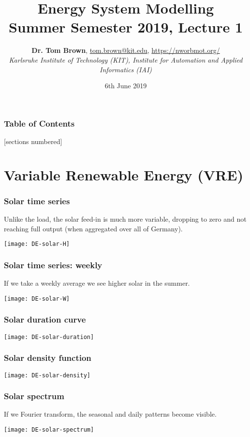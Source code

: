 \documentclass[10pt,aspectratio=169,dvipsnames]{beamer}
\title{Energy System Modelling\\ Summer Semester 2019, Lecture 1}
\author{
  {\bf Dr. Tom Brown}, \href{mailto:tom.brown@kit.edu}{tom.brown@kit.edu}, \url{https://nworbmot.org/}\\
  \emph{Karlsruhe Institute of Technology (KIT), Institute for Automation and Applied Informatics (IAI)}
}
\date{\vspace{.3cm}6th June 2019}
\begin{document}
\maketitle


\begin{frame}

  \frametitle{Table of Contents}
  [sections numbered]
  \tableofcontents[hideallsubsections]
\end{frame}


\section{Variable Renewable Energy (VRE)}



\begin{frame}
  \frametitle{Solar time series}

  Unlike the load, the solar feed-in is much more variable, dropping to zero and not reaching full output (when aggregated over all of Germany).


  \centering
  \texttt{[image: DE-solar-H]}

\end{frame}


\begin{frame}
  \frametitle{Solar time series: weekly}

  If we take a weekly average we see higher solar in the summer.

  \centering
  \texttt{[image: DE-solar-W]}

\end{frame}



\begin{frame}
  \frametitle{Solar duration curve}



  \centering
  \texttt{[image: DE-solar-duration]}

\end{frame}




\begin{frame}
  \frametitle{Solar density function}

  \centering
  \texttt{[image: DE-solar-density]}

\end{frame}




\begin{frame}
  \frametitle{Solar spectrum}

  If we Fourier transform, the \alert{seasonal} and \alert{daily} patterns become visible.

  \centering
  \texttt{[image: DE-solar-spectrum]}

\end{frame}
\end{document}
